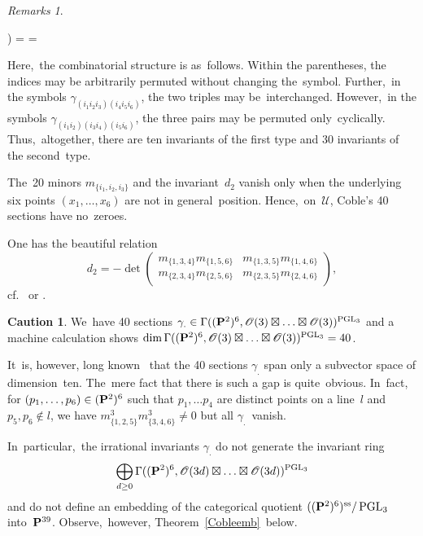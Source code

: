 \documentclass[reqno]{amsart}
\theoremstyle{definition}
\newtheorem{cau}[theorem]{Caution}
\theoremstyle{remark}
\newtheorem{rems}[theorem]{Remarks}
\numberwithin{equation}{section}
\newcommand{\calO}{\mathscr{O}}
\newcommand{\calU}{\mathscr{U}}
\newcommand{\PGL}{\mathop{\rm PGL}\nolimits}
\newcommand{\bP}{{\bf P}}
\newcounter{iii}
\newenvironment{iii}{\begin{list}{\rm \roman{iii}) }%
{\usecounter{iii} \leftmargin=0.0pt \labelsep=0.0pt %
\listparindent=0.0pt \labelwidth=0.0pt \parsep=\smallskipamount%
 \itemsep=0.0pt \topsep=0.0pt \partopsep=\smallskipamount}}{\end{list}}
\begin{document}
\begin{rems}\smallskip
\begin{iii}
\item
Here,~the combinatorial structure is as~follows. Within the parentheses, the indices may be arbitrarily permuted without changing the~symbol. Further,~in the symbols
$\gamma_{(i_1i_2i_3)(i_4i_5i_6)}$,
the two triples may be~interchanged. However,~in the symbols
$\gamma_{(i_1i_2)(i_3i_4)(i_5i_6)}$,
the three pairs may be permuted only~cyclically. Thus,~altogether, there are ten invariants of the first type and 30 invariants of the second~type.
\item
The~20 minors
$m_{\{i_1,i_2,i_3\}}$
and the
invariant~$d_2$
vanish only when the underlying six points
$(x_1, \ldots, x_6)$
are not in general~position.
Hence,~on~$\calU$,
Coble's 40 sections have no~zeroes.
\item
One has the beautiful relation
$$d_2 = - \det
\left(
\begin{array}{cc}
m_{\{1,3,4\}} m_{\{1,5,6\}} & m_{\{1,3,5\}} m_{\{1,4,6\}} \\
m_{\{2,3,4\}} m_{\{2,5,6\}} & m_{\{2,3,5\}} m_{\{2,4,6\}}
\end{array}
\right) ,
$$
cf.~\cite[(47)]{Co1} or \cite[formula~(4.18)]{Hu}.
\end{iii}
\end{rems}

\begin{cau}\smallskip
We~have 40 sections
$\gamma_. \in \Gamma((\bP^2)^6, \calO(3) \boxtimes \ldots \boxtimes \calO(3))^{\PGL_3}$
and a machine calculation shows
$\dim \Gamma((\bP^2)^6, \calO(3) \boxtimes \ldots \boxtimes \calO(3))^{\PGL_3} = 40$.

It~is, however, long known~\cite[(24)]{Co3} that the 40 sections
$\gamma_.$
span only a subvector space of dimension~ten. The~mere fact that there is such a gap is quite~obvious. In~fact, for
$(p_1, \ldots, p_6) \in (\bP^2)^6$
such that
$p_1, \ldots p_4$
are distinct points on a
line~$l$
and
$p_5, p_6 \not\in l$,
we have
$m_{\{1,2,5\}}^3 m_{\{3,4,6\}}^3 \neq 0$
but all
$\gamma_.$~vanish.

In~particular,~the irrational invariants
$\gamma_.$
do not generate the invariant ring
$$\bigoplus_{d \geq 0} \Gamma((\bP^2)^6, \calO(3d) \boxtimes \ldots \boxtimes \calO(3d))^{\PGL_3}$$
and do not define an embedding of the categorical quotient
$((\bP^2)^6)^{\text{\rm ss}} / \PGL_3$
\cite[Definition~0.5]{MFK}
into~$\bP^{39}$.
Observe,~however, Theorem~\ref{Cobleemb}~below.
\end{cau}
\end{document}
